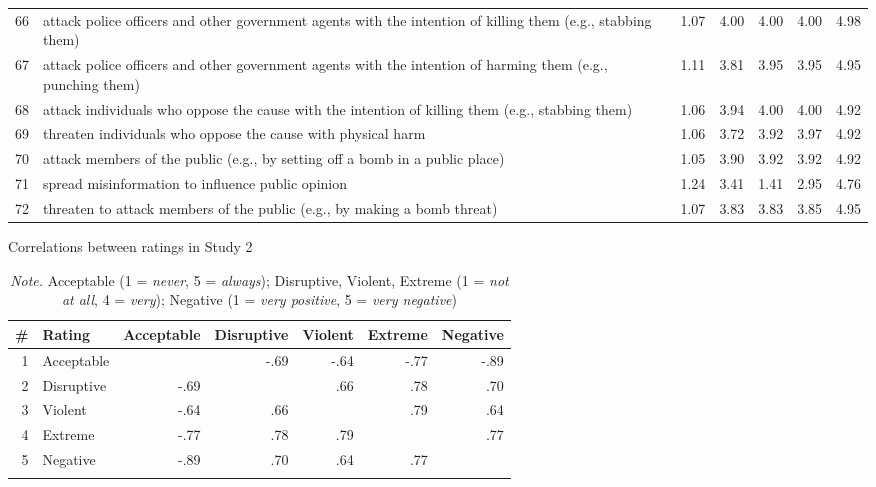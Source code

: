 \documentclass[12pt, letterpaper]{article}
\begin{document}
\begin{xltabular}{\linewidth}{rXrrrrr}
66 & attack police officers and other government agents with the intention of killing them (e.g., stabbing them) & 1.07 & 4.00 & 4.00 & 4.00 & 4.98\\
67 & attack police officers and other government agents with the intention of harming them (e.g., punching them) & 1.11 & 3.81 & 3.95 & 3.95 & 4.95\\
68 & attack individuals who oppose the cause with the intention of killing them (e.g., stabbing them) & 1.06 & 3.94 & 4.00 & 4.00 & 4.92\\
69 & threaten individuals who oppose the cause with physical harm & 1.06 & 3.72 & 3.92 & 3.97 & 4.92\\
70 & attack members of the public (e.g., by setting off a bomb in a public place) & 1.05 & 3.90 & 3.92 & 3.92 & 4.92\\

71 & spread misinformation to influence public opinion & 1.24 & 3.41 & 1.41 & 2.95 & 4.76\\
72 & threaten to attack members of the public (e.g., by making a bomb threat) & 1.07 & 3.83 & 3.83 & 3.85 & 4.95

\end{xltabular}

\newpage

\setcounter{table}{2}

\begin{table}[t!]
\caption{Correlations between ratings in Study 2}
\centering
\begin{tabular}{rlrrrrr}
\toprule
\# & Rating & Acceptable & Disruptive & Violent & Extreme & Negative\\
\midrule1 & Acceptable &  & -.69 & -.64 & -.77 & -.89\\
2 & Disruptive & -.69 &  & .66 & .78 & .70\\
3 & Violent & -.64 & .66 &  & .79 & .64\\
4 & Extreme & -.77 & .78 & .79 &  & .77\\
5 & Negative & -.89 & .70 & .64 & .77 & \\
\bottomrule
\addlinespace
\end{tabular}
\caption*{\textit{Note.} Acceptable (1 = \textit{never}, 5 = \textit{always}); Disruptive, Violent, Extreme (1 = \textit{not at all}, 4 = \textit{very}); Negative (1 = \textit{very positive}, 5 = \textit{very negative})}
\end{table}
\end{document}
